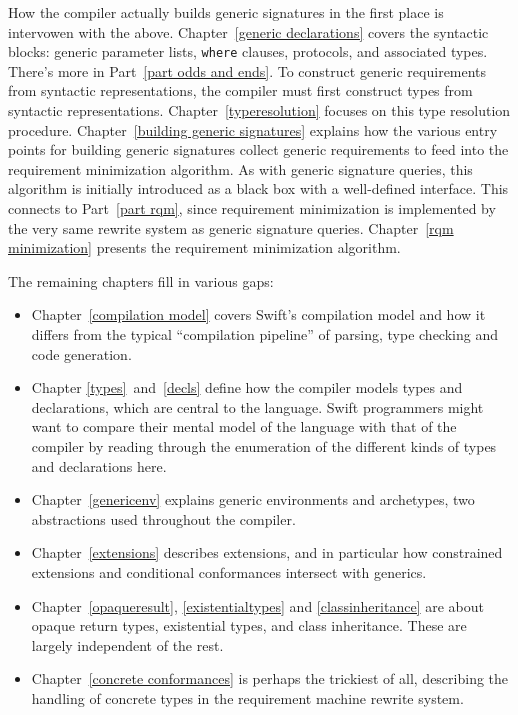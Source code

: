 \documentclass[../generics]{subfiles}
\begin{document}
How the compiler actually builds generic signatures in the first place is intervowen with the above. Chapter~\ref{generic declarations} covers the syntactic blocks: generic parameter lists, \texttt{where} clauses, protocols, and associated types. There's more in Part~\ref{part odds and ends}. To construct generic requirements from syntactic representations, the compiler must first construct types from syntactic representations. Chapter~\ref{typeresolution} focuses on this type resolution procedure. Chapter~\ref{building generic signatures} explains how the various entry points for building generic signatures collect generic requirements to feed into the requirement minimization algorithm. As with generic signature queries, this algorithm is initially introduced as a black box with a well-defined interface. This connects to Part~\ref{part rqm}, since requirement minimization is implemented by the very same rewrite system as generic signature queries. Chapter~\ref{rqm minimization} presents the requirement minimization algorithm.

The remaining chapters fill in various gaps:
\begin{itemize}
\item Chapter~\ref{compilation model} covers Swift's compilation model and how it differs from the typical ``compilation pipeline'' of parsing, type checking and code generation.

\item Chapter \ref{types}~and~\ref{decls} define how the compiler models types and declarations, which are central to the language. Swift programmers might want to compare their mental model of the language with that of the compiler by reading through the enumeration of the different kinds of types and declarations here.
\item Chapter~\ref{genericenv} explains generic environments and archetypes, two abstractions used throughout the compiler.

\item Chapter~\ref{extensions} describes extensions, and in particular how constrained extensions and conditional conformances intersect with generics.

\item Chapter~\ref{opaqueresult}, \ref{existentialtypes} and \ref{classinheritance} are about opaque return types, existential types, and class inheritance. These are largely independent of the rest.

\item Chapter~\ref{concrete conformances} is perhaps the trickiest of all, describing the handling of concrete types in the requirement machine rewrite system.
\end{itemize}
\end{document}
